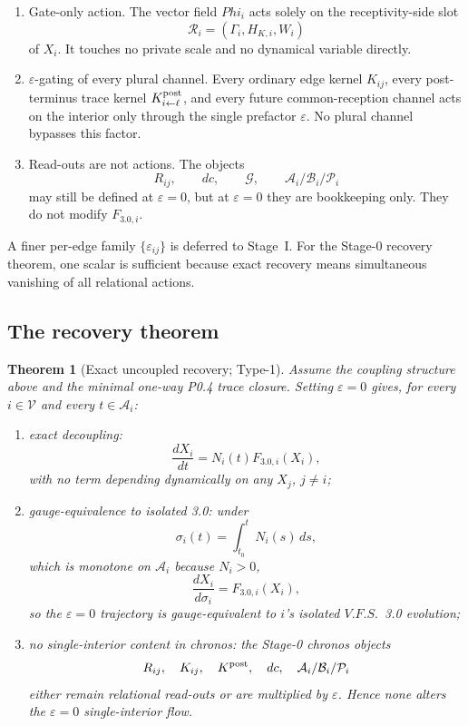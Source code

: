 \documentclass[11pt,a4paper]{article}
\def\Phi{Phi}%
\def\mathfrak#1{#1}%
\def\mathrm#1{#1}%
\def\emph#1{#1}%
\newcommand{\VFS}{\ensuremath{\mathrm{V.F.S.}}}
\theoremstyle{definition}
\theoremstyle{plain}
\newtheorem{theorem}[definition]{Theorem}
\theoremstyle{remark}
\begin{document}
\begin{enumerate}[label=\textup{(\roman*)},leftmargin=1.2cm]
\item \emph{Gate-only action.}
The vector field \(\Phi_i\) acts solely on the receptivity-side slot
\[
\mathcal R_i=(\Gamma_i,H_{K,i},W_i)
\]
of \(X_i\). It touches no private scale and no dynamical variable directly.

\item \emph{\(\varepsilon\)-gating of every plural channel.}
Every ordinary edge kernel \(K_{ij}\), every post-terminus trace kernel
\(K^{\rm post}_{i\leftarrow\ell}\), and every future common-reception channel
acts on the interior only through the single prefactor \(\varepsilon\). No plural
channel bypasses this factor.

\item \emph{Read-outs are not actions.}
The objects
\[
R_{ij},
\qquad
d\mathfrak c,
\qquad
\mathcal G,
\qquad
\mathcal A_i/\mathcal B_i/\mathcal P_i
\]
may still be defined at \(\varepsilon=0\), but at \(\varepsilon=0\) they are
bookkeeping only. They do not modify \(F_{3.0,i}\).
\end{enumerate}

A finer per-edge family \(\{\varepsilon_{ij}\}\) is deferred to Stage~I. For the
Stage-0 recovery theorem, one scalar is sufficient because exact recovery means
simultaneous vanishing of all relational actions.

\subsection{The recovery theorem}

\begin{theorem}[Exact uncoupled recovery; Type-1]\label{thm:recovery}
Assume the coupling structure above and the minimal one-way P0.4 trace closure.
Setting \(\varepsilon=0\) gives, for every \(i\in\mathcal V\) and every
\(t\in\mathcal A_i\):
\begin{enumerate}[label=\textup{(\alph*)},leftmargin=1.2cm]
\item \emph{exact decoupling}:
\[
\frac{dX_i}{dt}
=
N_i(t)F_{3.0,i}(X_i),
\]
with no term depending dynamically on any \(X_j\), \(j\neq i\);

\item \emph{gauge-equivalence to isolated 3.0}: under
\[
\sigma_i(t)=\int_{t_0}^{t}N_i(s)\,ds,
\]
which is monotone on \(\mathcal A_i\) because \(N_i>0\),
\[
\frac{dX_i}{d\sigma_i}
=
F_{3.0,i}(X_i),
\]
so the \(\varepsilon=0\) trajectory is gauge-equivalent to \(i\)'s isolated
\VFS\ 3.0 evolution;

\item \emph{no single-interior content in chronos}: the Stage-0 chronos objects
\[
R_{ij},\quad
K_{ij},\quad
K^{\rm post},\quad
d\mathfrak c,\quad
\mathcal A_i/\mathcal B_i/\mathcal P_i
\]
either remain relational read-outs or are multiplied by \(\varepsilon\). Hence
none alters the \(\varepsilon=0\) single-interior flow.
\end{enumerate}
\end{theorem}
\end{document}
